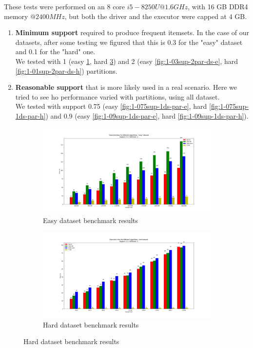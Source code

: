 \documentclass[a4paper]{article}
\begin{document}
	These tests were performed on an 8 core $i5-8250U @1.6GHz$, with 16 GB DDR4 memory $@2400MHz$, but both the driver and the executor were capped at 4 GB.
	\begin{enumerate}
		\item \textbf{Minimum support} required to produce frequent itemsets. In the case of our datasets, after some testing we figured that this is 0.3 for the "easy" dataset and 0.1 for the "hard" one.\\
		We tested with 1 (easy \ref{fig:1-03sup-1par-ds-e}, hard \ref{fig:1-01sup-1par-ds-h}) and 2 (easy \ref{fig:1-03sup-2par-ds-e}, hard \ref{fig:1-01sup-2par-ds-h}) partitions.
		\item \textbf{Reasonable support} that is more likely used in a real scenario. Here we tried to see ho performance varied with partitions, using all dataset.\\
		We tested with support 0.75 (easy \ref{fig:1-075sup-1ds-par-e}, hard \ref{fig:1-075sup-1ds-par-h}) and 0.9 (easy \ref{fig:1-09sup-1ds-par-e}, hard \ref{fig:1-09sup-1ds-par-h}).

	\end{enumerate}
	\begin{figure}[h]
		\centering
		\begin{subfigure}[b]{0.45\textwidth}
			\centering
			\includegraphics[width=\textwidth]{1_easy_0,3_1_dataset.png}
         	\caption{Easy dataset benchmark results}
         	\label{fig:1-03sup-1par-ds-e}
		\end{subfigure}
		\hfill		
		\begin{subfigure}[b]{0.45\textwidth}
			\centering
			\includegraphics[width=\textwidth]{1_hard_0,1_1_dataset.png}
         	\caption{Hard dataset benchmark results}
         	\label{fig:1-01sup-1par-ds-h}
		\end{subfigure}
		\hfill
		
	\end{figure}
	
\end{document}
